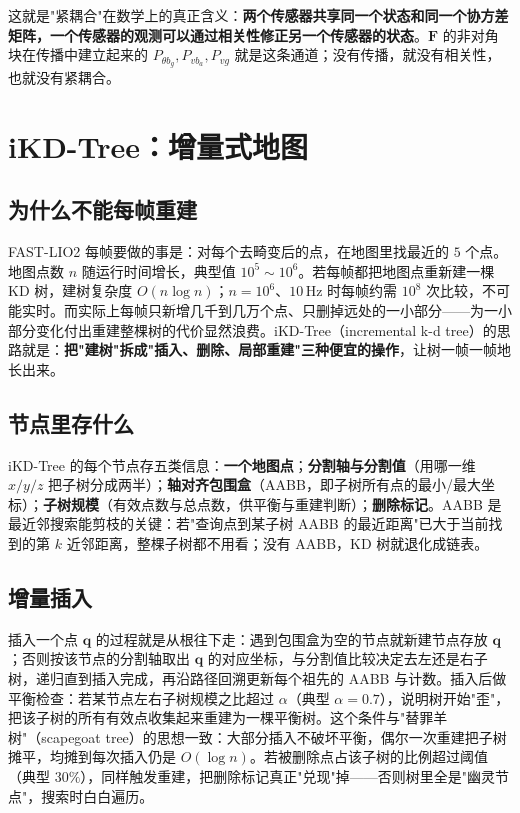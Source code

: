 这就是"紧耦合"在数学上的真正含义：\textbf{两个传感器共享同一个状态和同一个协方差矩阵，一个传感器的观测可以通过相关性修正另一个传感器的状态}。$\bm{F}$ 的非对角块在传播中建立起来的 $P_{\theta b_g},P_{v b_a},P_{v g}$ 就是这条通道；没有传播，就没有相关性，也就没有紧耦合。

\section{iKD-Tree：增量式地图}\label{sec:17-ikdtree}

\subsection{为什么不能每帧重建}

FAST-LIO2 每帧要做的事是：对每个去畸变后的点，在地图里找最近的 $5$ 个点。地图点数 $n$ 随运行时间增长，典型值 $10^5\sim10^6$。若每帧都把地图点重新建一棵 KD 树，建树复杂度 $O(n\log n)$；$n=10^6$、$10$\,Hz 时每帧约需 $10^8$ 次比较，不可能实时。而实际上每帧只新增几千到几万个点、只删掉远处的一小部分——为一小部分变化付出重建整棵树的代价显然浪费。iKD-Tree（incremental k-d tree）的思路就是：\textbf{把"建树"拆成"插入、删除、局部重建"三种便宜的操作}，让树一帧一帧地长出来。

\subsection{节点里存什么}

iKD-Tree 的每个节点存五类信息：\textbf{一个地图点}；\textbf{分割轴与分割值}（用哪一维 $x/y/z$ 把子树分成两半）；\textbf{轴对齐包围盒}（AABB，即子树所有点的最小/最大坐标）；\textbf{子树规模}（有效点数与总点数，供平衡与重建判断）；\textbf{删除标记}。AABB 是最近邻搜索能剪枝的关键：若"查询点到某子树 AABB 的最近距离"已大于当前找到的第 $k$ 近邻距离，整棵子树都不用看；没有 AABB，KD 树就退化成链表。

\subsection{增量插入}

插入一个点 $\bm{q}$ 的过程就是从根往下走：遇到包围盒为空的节点就新建节点存放 $\bm{q}$；否则按该节点的分割轴取出 $\bm{q}$ 的对应坐标，与分割值比较决定去左还是右子树，递归直到插入完成，再沿路径回溯更新每个祖先的 AABB 与计数。插入后做平衡检查：若某节点左右子树规模之比超过 $\alpha$（典型 $\alpha=0.7$），说明树开始"歪"，把该子树的所有有效点收集起来重建为一棵平衡树。这个条件与"替罪羊树"（scapegoat tree）的思想一致：大部分插入不破坏平衡，偶尔一次重建把子树摊平，均摊到每次插入仍是 $O(\log n)$。若被删除点占该子树的比例超过阈值（典型 $30\%$），同样触发重建，把删除标记真正"兑现"掉——否则树里全是"幽灵节点"，搜索时白白遍历。

